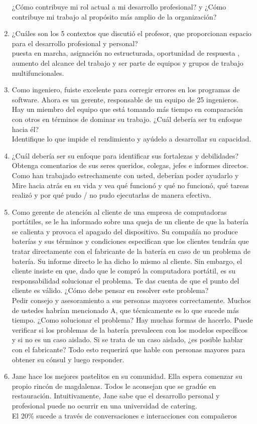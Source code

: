 \documentclass[10pt]{book}
\begin{document}
\begin{enumerate}[\bfseries 1.]
¿Cómo contribuye mi rol actual a mi desarrollo profesional? y ¿Cómo contribuye mi trabajo al propósito más amplio de la organización?
\item ¿Cuáles son los 5 contextos que discutió el profesor, que proporcionan espacio para el desarrollo profesional y personal?\\
puesta en marcha, asignación no estructurada, oportunidad de respuesta , aumento del alcance del trabajo y ser parte de equipos y grupos de trabajo multifuncionales.
\item Como ingeniero, fuiste excelente para corregir errores en los programas de software. Ahora es un gerente, responsable de un equipo de 25 ingenieros. Hay un miembro del equipo que está tomando más tiempo en comparación con otros en términos de dominar su trabajo. ¿Cuál debería ser tu enfoque hacia él?\\
Identifique lo que impide el rendimiento y ayúdelo a desarrollar su capacidad.
\item ¿Cuál debería ser su enfoque para identificar sus fortalezas y debilidades?\\
Obtenga comentarios de sus seres queridos, colegas, jefes e informes directos. Como han trabajado estrechamente con usted, deberían poder ayudarlo y Mire hacia atrás en su vida y vea qué funcionó y qué no funcionó, qué tareas realizó y por qué pudo / no pudo ejecutarlas de manera efectiva.
\item Como gerente de atención al cliente de una empresa de computadoras portátiles, se le ha informado sobre una queja de un cliente de que la batería se calienta y provoca el apagado del dispositivo. Su compañía no produce baterías y sus términos y condiciones especifican que los clientes tendrán que tratar directamente con el fabricante de la batería en caso de un problema de batería. Su informe directo le ha dicho lo mismo al cliente. Sin embargo, el cliente insiste en que, dado que le compró la computadora portátil, es su responsabilidad solucionar el problema. Te das cuenta de que el punto del cliente es válido. ¿Cómo debe pensar en resolver este problema?\\
Pedir consejo y asesoramiento a sus personas mayores correctamente. Muchos de ustedes habrían mencionado A, que técnicamente es lo que sucede más tiempo. ¿Como solucionar el problema? Hay muchas formas de hacerlo. Puede verificar si los problemas de la batería prevalecen con los modelos específicos y si no es un caso aislado. Si se trata de un caso aislado, ¿es posible hablar con el fabricante? Todo esto requerirá que hable con personas mayores para obtener su cónsul y luego responder.
\item Jane hace los mejores pastelitos en su comunidad. Ella espera comenzar su propio rincón de magdalenas. Todos le aconsejan que se gradúe en restauración. Intuitivamente, Jane sabe que el desarrollo personal y profesional puede no ocurrir en una universidad de catering.\\
El 20\% sucede a través de conversaciones e interacciones con compañeros
\end{enumerate}
\end{document}
